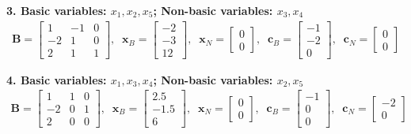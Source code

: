 \documentclass[11pt]{article}
\newcommand{\mb}[1]{\ensuremath{\boldsymbol{#1}}}
\begin{document}
\begin{enumerate}
\begin{enumerate}
		\textbf{3. Basic variables: $x_1, x_2, x_5$; Non-basic variables: $x_3, x_4$}
		\begin{align*}
		\mb{B} = \begin{bmatrix} 1 & -1 & 0 \\ -2 & 1 & 0 \\ 2 & 1 & 1 \end{bmatrix}, \;\; 
		\mb{x}_B = \begin{bmatrix} -2 \\ -3 \\ 12 \end{bmatrix}, \;\; 
		\mb{x}_N = \begin{bmatrix} 0 \\ 0 \end{bmatrix}, \;\; 
		\mb{c}_B = \begin{bmatrix} -1 \\ -2 \\ 0 \end{bmatrix}, \;\; 
		\mb{c}_N = \begin{bmatrix} 0 \\ 0 \end{bmatrix}
		\end{align*}
		
		\textbf{4. Basic variables: $x_1, x_3, x_4$; Non-basic variables: $x_2, x_5$}
		\begin{align*}
		\mb{B} = \begin{bmatrix} 1 & 1 & 0 \\ -2 & 0 & 1 \\ 2 & 0 & 0 \end{bmatrix}, \;\; 
		\mb{x}_B = \begin{bmatrix} 2.5 \\ -1.5 \\ 6 \end{bmatrix}, \;\; 
		\mb{x}_N = \begin{bmatrix} 0 \\ 0 \end{bmatrix}, \;\; 
		\mb{c}_B = \begin{bmatrix} -1 \\ 0 \\ 0 \end{bmatrix}, \;\; 
		\mb{c}_N = \begin{bmatrix} -2 \\ 0 \end{bmatrix}
		\end{align*}
		

\end{enumerate}
\end{enumerate}
\end{document}
